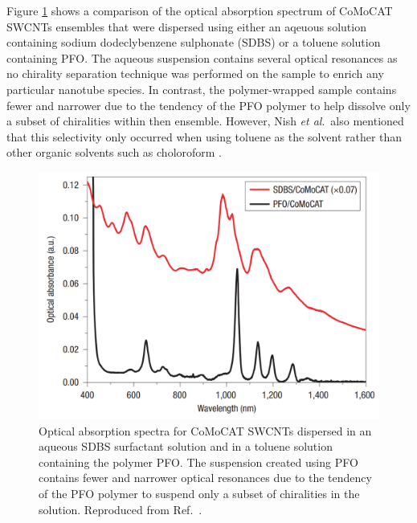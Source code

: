 Figure \ref{fig:comparison_nish} shows a comparison of the optical absorption spectrum of CoMoCAT SWCNTs ensembles that were dispersed using either an aqeuous solution containing sodium dodeclybenzene sulphonate (SDBS) or a toluene solution containing PFO. The aqueous suspension contains several optical resonances as no chirality separation technique was performed on the sample to enrich any particular nanotube species. In contrast, the polymer-wrapped sample contains fewer and narrower due to the tendency of the PFO polymer to help dissolve only a subset of chiralities within then ensemble. However, Nish \textit{et al}.\ also mentioned that this selectivity only occurred when using toluene as the solvent rather than other organic solvents such as choloroform \cite{nish2007highly}.

\begin{figure}[H]
	\centering
	\includegraphics[scale=1.4]{images/chapter_methods/purification_nish_2}
	\caption{Optical absorption spectra for CoMoCAT SWCNTs dispersed in an aqueous SDBS surfactant solution and in a toluene solution containing the polymer PFO. The suspension created using PFO contains fewer and narrower optical resonances due to the tendency of the PFO polymer to suspend only a subset of chiralities in the solution. Reproduced from Ref.\ \cite{nish2007highly}. }
	\label{fig:comparison_nish}
\end{figure}


